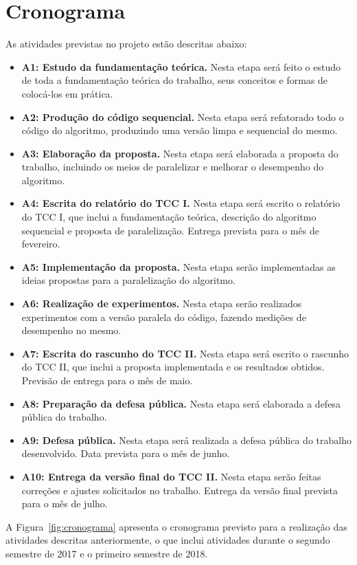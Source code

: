 \chapter{Cronograma}
\label{cap6}

As atividades previstas no projeto estão descritas abaixo:

\begin{itemize}
    \item \textbf{A1: Estudo da fundamentação teórica.} Nesta etapa será feito o estudo de toda a fundamentação teórica do trabalho, seus conceitos e formas de colocá-los em prática.
    \item \textbf{A2: Produção do código sequencial.} Nesta etapa será refatorado todo o código do algoritmo, produzindo uma versão limpa e sequencial do mesmo.
    \item \textbf{A3: Elaboração da proposta.} Nesta etapa será elaborada a proposta do trabalho, incluindo os meios de paralelizar e melhorar o desempenho do algoritmo.
    \item \textbf{A4: Escrita do relatório do TCC I.} Nesta etapa será escrito o relatório do TCC I, que inclui a fundamentação teórica, descrição do algoritmo sequencial e proposta de paralelização. Entrega prevista para o mês de fevereiro.
    \item \textbf{A5: Implementação da proposta.} Nesta etapa serão implementadas as ideias propostas para a paralelização do algoritmo.
    \item \textbf{A6: Realização de experimentos.} Nesta etapa serão realizados experimentos com a versão paralela do código, fazendo medições de desempenho no mesmo.
    \item \textbf{A7: Escrita do rascunho do TCC II.} Nesta etapa será escrito o rascunho do TCC II, que inclui a proposta implementada e os resultados obtidos. Previsão de entrega para o mês de maio.
    \item \textbf{A8: Preparação da defesa pública.} Nesta etapa será elaborada a defesa pública do trabalho.
    \item \textbf{A9: Defesa pública.} Nesta etapa será realizada a defesa pública do trabalho desenvolvido. Data prevista para o mês de junho.
    \item \textbf{A10: Entrega da versão final do TCC II.} Nesta etapa serão feitas correções e ajustes solicitados no trabalho. Entrega da versão final prevista para o mês de julho.
\end{itemize}

A Figura~\ref{fig:cronograma} apresenta o cronograma previsto para a realização das atividades descritas anteriormente, o que inclui atividades durante o segundo semestre de 2017 e o primeiro semestre de 2018.

